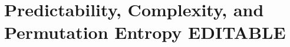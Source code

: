  \section{Predictability, Complexity, and Permutation Entropy {\color{blue}  EDITABLE}} %
 \label{sec:results}





